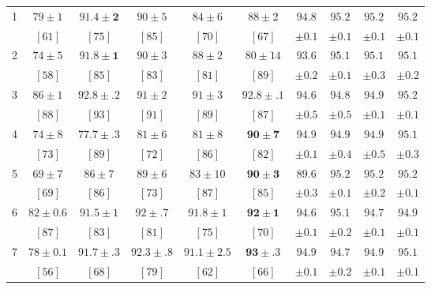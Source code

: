 \documentclass[final]{cvpr}
\begin{document}
\begin{table*}
\begin{center}
\begin{tabular}{|c|c|c|c|c|c|c|c|c|c|}
			\hline\hline
1 & $ 79 \pm 1 $  & $ \mathbf{91.4 \pm 2} $  & $ 90 \pm 5 $  & $  84 \pm 6 $ & $ 88 \pm 2 $ & $ 94.8 $ & $ 95.2 $ & $ 95.2 $ & $ 95.2 $   \\
			& $ [61]  $  & $ [75] $  & $ [85] $  & $ [70] $  & $ [67] $ & $ \pm 0.1 $ & $ \pm 0.1 $ & $ \pm 0.1 $ & $ \pm 0.1 $   \\
			\hline
			2 & $ 74 \pm 5 $  & $ \mathbf{91.8 \pm 1} $  & $ 90 \pm 3 $  & $  88 \pm 2 $ & $ 80 \pm 14 $ & $ 93.6 $ & $ 95.1 $ & $ 95.1 $ & $ 95.1 $   \\
			& $ [58]  $  & $ [85] $  & $ [83] $  & $ [81] $  & $ [89] $ & $ \pm 0.2  $ & $ \pm 0.1 $ & $ \pm 0.3 $ & $ \pm 0.2 $   \\
			\hline
			3 & $ 86 \pm 1 $  & $ 92.8 \pm .2 $  & $ 91 \pm 2 $  & $ 91 \pm 3 $ & $ \mathbf{92.8 \pm .1} $ & $ 94.6 $ & $ 94.8 $ & $ 94.9 $ & $ 95.2 $   \\
			& $ [88]  $  & $ [93] $  & $ [91] $  & $ [89] $  & $ [87] $ & $ \pm 0.5 $ & $ \pm 0.5 $ & $ \pm 0.1  $ & $ \pm 0.1 $   \\
			\hline
			4 & $ 74 \pm 8 $  & $ 77.7 \pm .3 $  & $ 81 \pm 6 $  & $ 81 \pm 8 $ & $ \mathbf{90 \pm 7} $ & $ 94.9 $ & $ 94.9 $ & $ 94.9 $ & $ 95.1 $   \\
			& $ [73]  $  & $ [89] $  & $ [72] $  & $ [86] $  & $ [82] $ & $ \pm 0.1 $ & $ \pm 0.4 $ & $ \pm 0.5  $ & $ \pm 0.3 $   \\
			\hline
			5 & $ 69 \pm 7 $  & $ 86 \pm 7 $  & $ 89 \pm 6 $  & $ 83 \pm 10 $ & $ \mathbf{90 \pm 3} $ & $ 89.6 $ & $ 95.2 $ & $ 95.2 $ & $ 95.2 $   \\
			& $ [69]  $  & $ [86] $  & $ [73] $  & $ [87] $  & $ [85] $ & $ \pm 0.3 $ & $ \pm 0.1 $ & $ \pm 0.2 $ & $  \pm 0.1 $   \\
			\hline
			6 & $ 82 \pm 0.6 $  & $ 91.5 \pm 1 $  & $ 92 \pm .7 $  & $ 91.8 \pm 1 $ & $ \mathbf{92 \pm 1} $ & $ 94.6 $ & $ 95.1 $ & $ 94.7 $ & $ 94.9 $   \\
			& $ [87]  $  & $ [83] $  & $ [81] $  & $ [75] $  & $ [70] $ & $ \pm 0.1 $ & $ \pm 0.2 $ & $ \pm 0.1 $ & $ \pm 0.1 $   \\
			\hline			
			7 & $ 78 \pm 0.1 $  & $ 91.7 \pm .3 $  & $ 92.3 \pm .8 $  & $ 91.1 \pm 2.5 $ & $ \mathbf{93 \pm .3} $ & $ 94.9 $ & $ 94.7 $ & $ 94.9 $ & $ 95.1 $   \\
			& $ [56]  $  & $ [68] $  & $ [79] $  & $ [62] $  & $ [66] $ & $ \pm 0.1 $ & $ \pm 0.2 $ & $ \pm 0.1 $ & $ \pm 0.1 $   \\
			\hline			
			

\end{tabular}
\end{center}
\end{table*}
\end{document}
